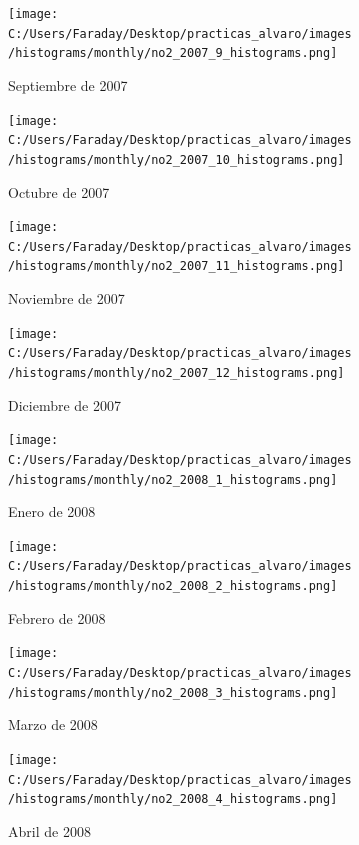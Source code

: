 \documentclass[12pt]{article}
\begin{document}
\begin{figure}[H]
\centering
\begin{subfigure}[h]{0.45\textwidth}
\texttt{[image: C:/Users/Faraday/Desktop/practicas\_alvaro/images/histograms/monthly/no2\_2007\_9\_histograms.png]}
\caption{Septiembre de 2007}
\label{fig:hist-mon-1-9-2007}
\end{subfigure}
%
\begin{subfigure}[H]{0.45\textwidth}
\texttt{[image: C:/Users/Faraday/Desktop/practicas\_alvaro/images/histograms/monthly/no2\_2007\_10\_histograms.png]}
\caption{Octubre de 2007}
\label{fig:hist-mon-1-10-2007}
\end{subfigure}
\caption{}
\end{figure}

\begin{figure}[H]
\centering
\begin{subfigure}[h]{0.45\textwidth}
\texttt{[image: C:/Users/Faraday/Desktop/practicas\_alvaro/images/histograms/monthly/no2\_2007\_11\_histograms.png]}
\caption{Noviembre de 2007}
\label{fig:hist-mon-1-11-2007}
\end{subfigure}
%
\begin{subfigure}[H]{0.45\textwidth}
\texttt{[image: C:/Users/Faraday/Desktop/practicas\_alvaro/images/histograms/monthly/no2\_2007\_12\_histograms.png]}
\caption{Diciembre de 2007}
\label{fig:hist-mon-1-12-2007}
\end{subfigure}
\caption{}
\end{figure}

\newpage

\begin{figure}[H]
\centering
\begin{subfigure}[h]{0.45\textwidth}
\texttt{[image: C:/Users/Faraday/Desktop/practicas\_alvaro/images/histograms/monthly/no2\_2008\_1\_histograms.png]}
\caption{Enero de 2008}
\label{fig:hist-mon-1-1-2008}
\end{subfigure}
%
\begin{subfigure}[H]{0.45\textwidth}
\texttt{[image: C:/Users/Faraday/Desktop/practicas\_alvaro/images/histograms/monthly/no2\_2008\_2\_histograms.png]}
\caption{Febrero de 2008}
\label{fig:hist-mon-1-2-2008}
\end{subfigure}
\caption{}
\end{figure}

\begin{figure}[H]
\centering
\begin{subfigure}[h]{0.45\textwidth}
\texttt{[image: C:/Users/Faraday/Desktop/practicas\_alvaro/images/histograms/monthly/no2\_2008\_3\_histograms.png]}
\caption{Marzo de 2008}
\label{fig:hist-mon-1-3-2008}
\end{subfigure}
%
\begin{subfigure}[H]{0.45\textwidth}
\texttt{[image: C:/Users/Faraday/Desktop/practicas\_alvaro/images/histograms/monthly/no2\_2008\_4\_histograms.png]}
\caption{Abril de 2008}
\label{fig:hist-mon-1-4-2008}
\end{subfigure}
\caption{}
\end{figure}
\end{document}
